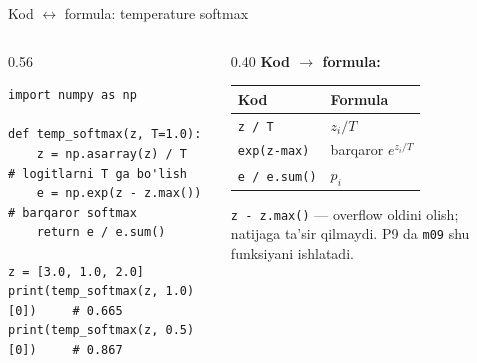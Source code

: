 \documentclass[aspectratio=169,11pt]{beamer}
\begin{document}
\begin{frame}[fragile]{Kod $\leftrightarrow$ formula: temperature softmax}
  \begin{columns}[T]
    \begin{column}{0.56\textwidth}
\begin{lstlisting}
import numpy as np

def temp_softmax(z, T=1.0):
    z = np.asarray(z) / T          # logitlarni T ga bo'lish
    e = np.exp(z - z.max())        # barqaror softmax
    return e / e.sum()

z = [3.0, 1.0, 2.0]
print(temp_softmax(z, 1.0)[0])     # 0.665
print(temp_softmax(z, 0.5)[0])     # 0.867
\end{lstlisting}
    \end{column}
    \begin{column}{0.40\textwidth}
      \textbf{Kod $\to$ formula:}\\[3pt]
      \footnotesize
      \begin{tabular}{p{1.9cm}p{2.1cm}}
        \toprule
        Kod & Formula \\
        \midrule
        \texttt{z / T} & $z_i/T$ \\
        \texttt{exp(z-max)} & barqaror $e^{z_i/T}$ \\
        \texttt{e / e.sum()} & $p_i$ \\
        \bottomrule
      \end{tabular}
      \vspace{4pt}
      \begin{tcolorbox}[okbox,top=2pt,bottom=2pt]
        \footnotesize
        \texttt{z - z.max()} --- overflow oldini olish; natijaga ta'sir qilmaydi.
        P9 da \texttt{m09} shu funksiyani ishlatadi.
      \end{tcolorbox}
    \end{column}
  \end{columns}
\end{frame}
\end{document}
